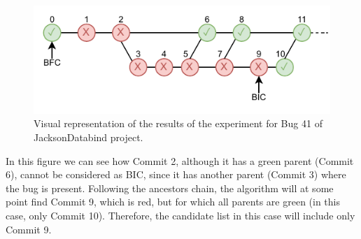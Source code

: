 \begin{figure}[ht!]
  \centering   
  \includegraphics[width=\columnwidth]{pages/03-BugHunter/images/Databind_41.pdf}
  \caption{Visual representation of the results of the experiment for Bug 41 of JacksonDatabind project.}
  \label{fig:bug41}
\end{figure}

In this figure we can see how Commit 2, although it has a green parent (Commit 6), cannot be considered as BIC, since it has another parent (Commit 3) where the bug is present. Following the ancestors chain, the algorithm will at some point find Commit 9, which is red, but for which all parents are green (in this case, only Commit 10). 
Therefore, the candidate list in this case will include only Commit 9.



